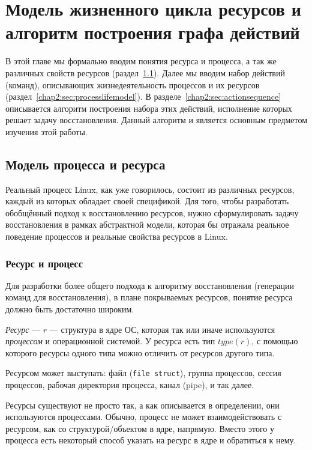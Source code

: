 
\chapter{Модель жизненного цикла ресурсов и алгоритм построения графа действий}

В этой главе мы формально вводим понятия ресурса и процесса, а так же различных свойств ресурсов 
(раздел~\ref{chap2:sec:procresmodel}). Далее мы вводим набор действий (команд), описывающих жизнедеятельность 
процессов и их ресурсов (раздел~\ref{chap2:sec:processlifemodel}). В разделе~\ref{chap2:sec:actionsequence} 
описывается алгоритм построения набора этих действий, исполнение которых решает задачу восстановления. 
Данный алгоритм и является основным предметом изучения этой работы.

\section{Модель процесса и ресурса}
\label{chap2:sec:procresmodel}

Реальный процесс Linux, как уже говорилось, состоит из различных ресурсов, каждый из которых обладает своей 
спецификой. Для того, чтобы разработать обобщённый подход к восстановлению ресурсов, нужно сформулировать задачу 
восстановления в рамках абстрактной модели, которая бы отражала реальное поведение процессов и реальные свойства 
ресурсов в Linux.

\subsection{Ресурс и процесс}

Для разработки более общего подхода к алгоритму восстановления (генерации команд для восстановления), в плане 
покрываемых ресурсов, понятие ресурса должно быть достаточно широким.

\begin{defn}
\label{def:resource}
\emph{Ресурс} --- $r$ --- структура в ядре ОС, которая так или иначе используются \emph{процессом} и операционной 
системой. У ресурса есть тип $type(r)$, с помощью которого ресурсы одного типа можно отличить от ресурсов другого типа.
\end{defn}

Ресурсом может выступать: файл (\texttt{file struct}), группа процессов, сессия процессов, рабочая директория 
процесса, канал (pipe), и так далее.

Ресурсы существуют не просто так, а как описывается в определении, они используются процессами. Обычно, процесс не 
может взаимодействовать с ресурсом, как со структурой/объектом в ядре, напрямую. Вместо этого у процесса есть 
некоторый способ указать на ресурс в ядре и обратиться к нему.

